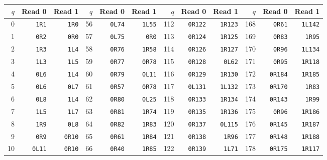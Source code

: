 \begingroup
\fontsize{9}{10}\selectfont
\setlength{\tabcolsep}{4pt}
\renewcommand{\arraystretch}{0.94}
\begin{center}
\begin{tabular}{rrr@{\hspace{5mm}}rrr@{\hspace{5mm}}rrr@{\hspace{5mm}}rrr}
\toprule
$q$ & Read 0 & Read 1 & $q$ & Read 0 & Read 1 & $q$ & Read 0 & Read 1 & $q$ & Read 0 & Read 1 \\
\midrule
0 & \texttt{1R1} & \texttt{1R0} & 56 & \texttt{0L74} & \texttt{1L55} & 112 & \texttt{0R122} & \texttt{1R123} & 168 & \texttt{0R61} & \texttt{1L142} \\
1 & \texttt{0R2} & \texttt{0R0} & 57 & \texttt{0L75} & \texttt{0R0} & 113 & \texttt{0R124} & \texttt{1R125} & 169 & \texttt{0R83} & \texttt{1R95} \\
2 & \texttt{1R3} & \texttt{1L4} & 58 & \texttt{0R76} & \texttt{1R58} & 114 & \texttt{0R126} & \texttt{1R127} & 170 & \texttt{0R96} & \texttt{1L134} \\
3 & \texttt{1L3} & \texttt{1L5} & 59 & \texttt{0R77} & \texttt{0R78} & 115 & \texttt{0R128} & \texttt{0L62} & 171 & \texttt{0R95} & \texttt{1R118} \\
4 & \texttt{0L6} & \texttt{1L4} & 60 & \texttt{0R79} & \texttt{0L11} & 116 & \texttt{0R129} & \texttt{1R130} & 172 & \texttt{0R184} & \texttt{1R185} \\
5 & \texttt{0L6} & \texttt{0L7} & 61 & \texttt{0R57} & \texttt{0R78} & 117 & \texttt{0L131} & \texttt{1L132} & 173 & \texttt{0R170} & \texttt{1R83} \\
6 & \texttt{0L8} & \texttt{1L4} & 62 & \texttt{0R80} & \texttt{0L25} & 118 & \texttt{0R133} & \texttt{1R134} & 174 & \texttt{0R143} & \texttt{1R99} \\
7 & \texttt{1L5} & \texttt{1L7} & 63 & \texttt{0R81} & \texttt{1R74} & 119 & \texttt{0R135} & \texttt{1R136} & 175 & \texttt{0R96} & \texttt{1R186} \\
8 & \texttt{1R9} & \texttt{0L8} & 64 & \texttt{0R82} & \texttt{1R83} & 120 & \texttt{0R137} & \texttt{0L115} & 176 & \texttt{0R145} & \texttt{1R187} \\
9 & \texttt{0R9} & \texttt{0R10} & 65 & \texttt{0R61} & \texttt{1R84} & 121 & \texttt{0R138} & \texttt{1R96} & 177 & \texttt{0R148} & \texttt{1R188} \\
10 & \texttt{0L11} & \texttt{0R10} & 66 & \texttt{0R40} & \texttt{1R85} & 122 & \texttt{0R139} & \texttt{1L71} & 178 & \texttt{0R175} & \texttt{1R117} \\

\end{tabular}
\end{center}
